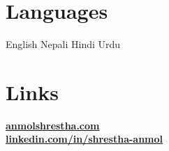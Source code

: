 \documentclass[]{deedy-resume-openfont}
\begin{document}
\begin{minipage}[t]{0.30\textwidth}
\section{Languages}
English \textbullet{} Nepali \textbullet{} Hindi \textbullet{} Urdu
\sectionsep

\section{Links}
\href{https://www.anmolshrestha.com/}{\bf anmolshrestha.com} \\
\href{https://www.linkedin.com/in/shrestha-anmol/}{\bf linkedin.com/in/shrestha-anmol}

\end{minipage}
\hfill
\end{document}
